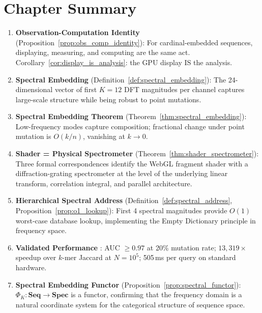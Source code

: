 \section*{Chapter Summary}

\begin{chapterbox}[title=Chapter 26 --- Key Results Established]
\begin{enumerate}[label=\textbf{\arabic*.}]
  \item \textbf{Observation-Computation Identity}
        (Proposition~\ref{prop:obs_comp_identity}): For cardinal-embedded
        sequences, displaying, measuring, and computing are the same act.
        Corollary~\ref{cor:display_is_analysis}: the GPU display IS the analysis.

  \item \textbf{Spectral Embedding} (Definition~\ref{def:spectral_embedding}):
        The 24-dimensional vector of first $K=12$ DFT magnitudes per channel
        captures large-scale structure while being robust to point mutations.

  \item \textbf{Spectral Embedding Theorem} (Theorem~\ref{thm:spectral_embedding}):
        Low-frequency modes capture composition; fractional change under point
        mutation is $O(k/n)$, vanishing at $k \to 0$.

  \item \textbf{Shader = Physical Spectrometer} (Theorem~\ref{thm:shader_spectrometer}):
        Three formal correspondences identify the WebGL fragment shader with
        a diffraction-grating spectrometer at the level of the underlying linear
        transform, correlation integral, and parallel architecture.

  \item \textbf{Hierarchical Spectral Address} (Definition~\ref{def:spectral_address},
        Proposition~\ref{prop:o1_lookup}): First 4 spectral magnitudes provide
        $O(1)$ worst-case database lookup, implementing the Empty Dictionary
        principle in frequency space.

  \item \textbf{Validated Performance} \citep{Sachikonye2025_Shader}:
        AUC $\geq 0.97$ at 20\% mutation rate; $13,\!319\times$ speedup over
        $k$-mer Jaccard at $N=10^5$; 505\,ms per query on standard hardware.

  \item \textbf{Spectral Embedding Functor} (Proposition~\ref{prop:spectral_functor}):
        $\Phi_K : \mathbf{Seq} \to \mathbf{Spec}$ is a functor, confirming
        that the frequency domain is a natural coordinate system for the
        categorical structure of sequence space.
\end{enumerate}
\end{chapterbox}
